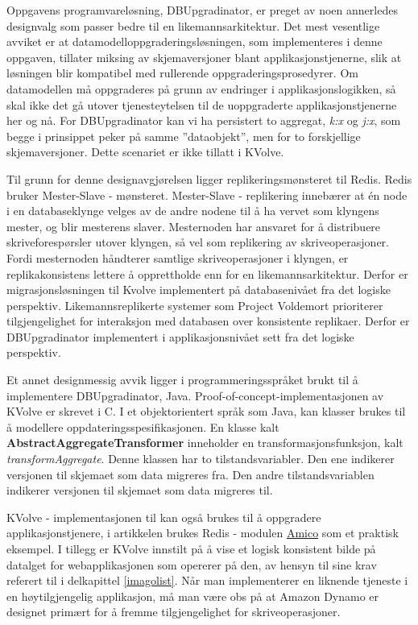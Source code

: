 Oppgavens programvareløsning, DBUpgradinator, er preget av noen annerledes designvalg som passer bedre til en likemannsarkitektur. Det mest vesentlige avviket er at datamodelloppgraderingsløsningen, som implementeres i denne oppgaven, tillater miksing av skjemaversjoner blant applikasjonstjenerne, slik at løsningen blir kompatibel med rullerende oppgraderingsprosedyrer. Om datamodellen må oppgraderes på grunn av endringer i applikasjonslogikken, så skal ikke det gå utover tjenesteytelsen til de uoppgraderte applikasjonstjenerne her og nå. For DBUpgradinator kan vi ha persistert to aggregat, \emph{k:x} og \emph{j:x}, som begge i prinsippet peker på samme ''dataobjekt'', men for to forskjellige skjemaversjoner. Dette scenariet er ikke tillatt i KVolve.

Til grunn for denne designavgjørelsen ligger replikeringsmønsteret til Redis. Redis bruker Mester-Slave - mønsteret. Mester-Slave - replikering innebærer at én node i en databaseklynge velges av de andre nodene til å ha vervet som klyngens mester, og blir mesterens slaver. Mesternoden har ansvaret for å distribuere skriveforespørsler utover klyngen, så vel som replikering av skriveoperasjoner. Fordi mesternoden håndterer samtlige skriveoperasjoner i klyngen, er replikakonsistens lettere å opprettholde enn for en likemannsarkitektur. Derfor er migrasjonsløsningen til Kvolve implementert på databasenivået fra det logiske perspektiv. Likemannsreplikerte systemer som Project Voldemort prioriterer tilgjengelighet for interaksjon med databasen over konsistente replikaer. Derfor er DBUpgradinator implementert i applikasjonsnivået sett fra det logiske perspektiv.

Et annet designmessig avvik ligger i programmeringsspråket brukt til å implementere DBUpgradinator, Java. Proof-of-concept-implementasjonen av KVolve er skrevet i C. I et objektorientert språk som Java, kan klasser brukes til å modellere oppdateringsspesifikasjonen. En klasse kalt \textbf{AbstractAggregateTransformer} inneholder en transformasjonsfunksjon, kalt \emph{transformAggregate}. Denne klassen har to tilstandsvariabler. Den ene indikerer versjonen til skjemaet som data migreres fra. Den andre tilstandsvariablen indikerer versjonen til skjemaet som data migreres til.

KVolve - implementasjonen til \cite{saur2016} kan også brukes til å oppgradere applikasjonstjenere, i artikkelen brukes Redis - modulen \underline{Amico} som et praktisk eksempel. I tillegg er KVolve innstilt på å vise et logisk konsistent bilde på datalget for webapplikasjonen som opererer på den, av hensyn til \cite{dumitras2009nodowntime} sine krav referert til i delkapittel \ref{imagolist}. Når man implementerer en liknende tjeneste i en høytilgjengelig applikasjon, må man være obs på at Amazon Dynamo er designet primært for å fremme tilgjengelighet for skriveoperasjoner.

